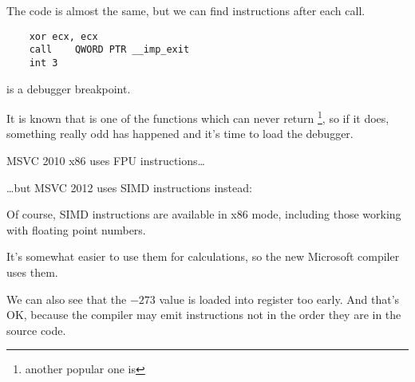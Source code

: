 
The code is almost the same, but we can find  instructions after each  call.

\begin{lstlisting}
	xor	ecx, ecx
	call	QWORD PTR __imp_exit
	int	3
\end{lstlisting}

 is a debugger breakpoint.

It is known that  is one of the functions which can never return
\footnote{another popular one is },
so if it does, something really odd has happened and it's time to load the debugger.




MSVC 2010 x86 uses \ac{FPU} instructions\dots



\dots but MSVC  2012 uses \ac{SIMD} instructions instead:



Of course, \ac{SIMD} instructions are available in x86 mode, 
including those working with floating point numbers.

It's somewhat easier to use them for calculations, so the new Microsoft compiler uses them.

We can also see that the $-273$ value 
is loaded into  register too early.
And that's OK, because the compiler may emit instructions not in 
the order they are in the source code.
